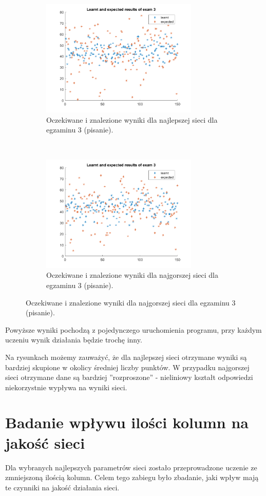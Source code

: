 \documentclass[12pt]{article}
\begin{document}
\begin{figure}[H]
\begin{subfigure}[t]{0.48\textwidth} 
\centering
\includegraphics[height=2.2in]{best_results_3.png}
\caption{Oczekiwane i znalezione wyniki dla najlepszej sieci dla egzaminu 3 (pisanie).}
\end{subfigure}
~~
\begin{subfigure}[t]{0.48\textwidth} 
\centering
\includegraphics[height=2.2in]{worst_exam_3.png}
\caption{Oczekiwane i znalezione wyniki dla najgorszej sieci dla egzaminu 3 (pisanie).}
\end{subfigure}
\end{figure}

Powyższe wyniki pochodzą z pojedynczego uruchomienia programu, przy każdym uczeniu wynik działania będzie trochę inny. 

Na rysunkach możemy zauważyć, że dla najlepszej sieci otrzymane wyniki są bardziej skupione w okolicy średniej liczby punktów. W przypadku najgorszej sieci otrzymane dane są bardziej ''rozproszone'' -  nieliniowy kształt odpowiedzi niekorzystnie wypływa na wyniki sieci.

\pagebreak
\section{Badanie wpływu ilości kolumn na jakość sieci}

Dla wybranych najlepszych parametrów sieci zostało przeprowadzone uczenie ze zmniejszoną ilością kolumn. Celem tego zabiegu było zbadanie, jaki wpływ mają te czynniki na jakość działania sieci. 
\end{document}
